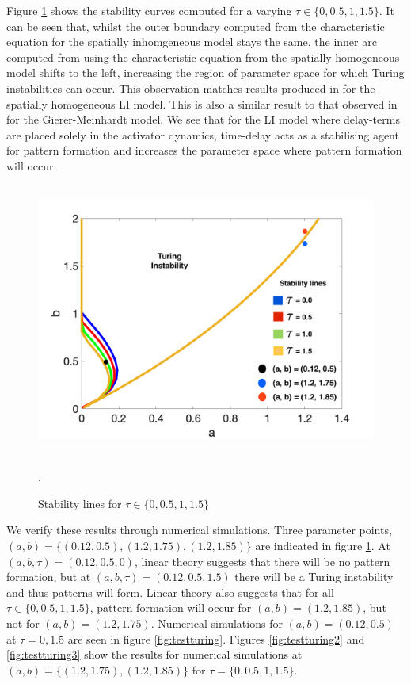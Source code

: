 \documentclass[12pt]{report}
\begin{document}
Figure \ref{fig:tspacetau} shows the stability curves computed for a varying $\tau\in\{0,0.5,1,1.5\}$. It can be seen that, whilst the outer boundary computed from the characteristic equation for the spatially inhomgeneous model stays the same, the inner arc computed from using the characteristic equation from the spatially homogeneous model shifts to the left, increasing the region of parameter space for which Turing instabilities can occur. This observation matches results produced in \cite{william} for the spatially homogeneous LI model. This is also a similar result to that observed in \cite{fadai} for the Gierer-Meinhardt model. We see that for the LI model where delay-terms are placed solely in the activator dynamics, time-delay acts as a stabilising agent for pattern formation and increases the parameter space where pattern formation will occur.
\begin{figure}[H]
        \centering
        \includegraphics[width=12cm,height = 9cm]{tspacetau.png}
        \caption{Stability lines for $\tau\in\{0,0.5,1,1.5\}$}.
        \label{fig:tspacetau}
\end{figure}
We verify these results through numerical simulations. Three parameter points, $(a,b)=\{(0.12,0.5),(1.2,1.75),(1.2,1.85)\}$ are indicated in figure \ref{fig:tspacetau}. At $(a,b,\tau)=(0.12,0.5,0)$, linear theory suggests that there will be no pattern formation, but at $(a,b,\tau)=(0.12,0.5,1.5)$ there will be a Turing instability and thus patterns will form. Linear theory also suggests that for all $\tau\in\{0,0.5,1,1.5\}$, pattern formation will occur for $(a,b)=(1.2,1.85)$, but not for $(a,b)=(1.2,1.75)$. Numerical simulations for $(a,b)=(0.12,0.5)$ at $\tau=0,1.5$ are seen in figure \ref{fig:testturing}. Figures \ref{fig:testturing2} and \ref{fig:testturing3} show the results for numerical simulations at $(a,b)=\{(1.2,1.75),(1.2,1.85)\}$ for $\tau=\{0,0.5,1,1.5\}$.
\end{document}
